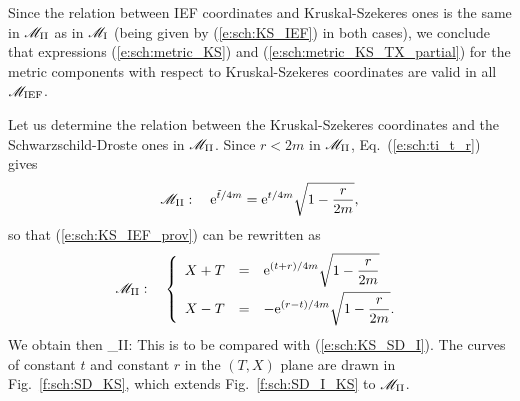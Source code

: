 Since the relation between IEF coordinates and Kruskal-Szekeres ones is the
same in $\mathscr{M}_{\rm II}$ as in $\mathscr{M}_{\rm I}$ (being given by (\ref{e:sch:KS_IEF})
in both cases), we conclude that expressions (\ref{e:sch:metric_KS}) and (\ref{e:sch:metric_KS_TX_partial})
for the metric components with respect to
Kruskal-Szekeres coordinates are valid in all $\mathscr{M}_{\rm IEF}$.

Let us determine the relation between the Kruskal-Szekeres coordinates and
the Schwarz\-schild-Droste ones in $\mathscr{M}_{\rm II}$. Since $r<2m$ in $\mathscr{M}_{\rm II}$,
Eq.~(\ref{e:sch:ti_t_r}) gives
\[
    \mathscr{M}_{\rm II}: \quad  \mathrm{e}^{{\tilde t}/4m} = \mathrm{e}^{t/4m}  \sqrt{1 -  \frac{r}{2m} } ,
\]
so that (\ref{e:sch:KS_IEF_prov}) can be rewritten as
\[
     \mathscr{M}_{\rm II}: \quad
\left\{\begin{array}{lcl}
    X+T & = & \displaystyle \mathrm{e}^{(t+r)/4m} \sqrt{1 -  \frac{r}{2m} }  \\[2ex]
    X-T & = & \displaystyle  - \mathrm{e}^{(r -t)/4m}  \sqrt{1 -  \frac{r}{2m} }.
    \end{array}\right.
\]
We obtain then
\be \label{e:sch:KS_SD_II}
    \M_{\rm II}: \quad {}
    \iff
\ee
This is to be compared with (\ref{e:sch:KS_SD_I}).
The curves of constant $t$ and constant $r$ in the $(T,X)$ plane
are drawn in Fig.~\ref{f:sch:SD_KS}, which extends Fig.~\ref{f:sch:SD_I_KS}
to $\mathscr{M}_{\rm II}$.


